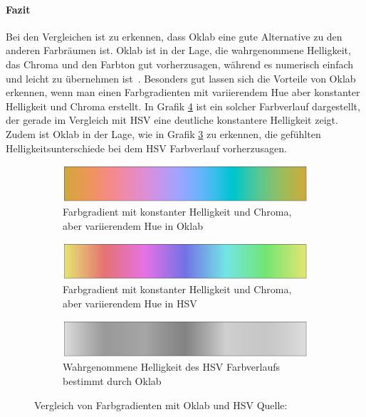 \documentclass[12pt, a4paper, ngerman]{article}
\begin{document}
\paragraph{Fazit}
Bei den Vergleichen ist zu erkennen, dass Oklab eine gute Alternative zu den anderen Farbräumen ist.
Oklab ist in der Lage, die wahrgenommene Helligkeit, das Chroma und den Farbton gut vorherzusagen, 
während es numerisch einfach und leicht zu übernehmen ist~\cite{Oklab_2020}.
Besonders gut lassen sich die Vorteile von Oklab erkennen, 
wenn man einen Farbgradienten mit variierendem Hue aber konstanter Helligkeit und Chroma erstellt. 
In Grafik \ref{fig:oklab_hsv} ist ein solcher Farbverlauf dargestellt, der gerade im Vergleich mit HSV eine deutliche konstantere Helligkeit zeigt. 
Zudem ist Oklab in der Lage, wie in Grafik \ref{fig:hsv_lightness} zu erkennen, die gefühlten Helligkeitsunterschiede bei dem HSV Farbverlauf vorherzusagen.

\begin{figure}
  \centering
  \begin{subfigure}[b]{\linewidth}
  \centering
  \includegraphics[width=0.9\linewidth]{Grafiken/Oklab_HSV/hue_oklab.png}
  \caption{Farbgradient mit konstanter Helligkeit und Chroma, aber variierendem Hue in Oklab}
  \label{fig:hue_oklab}
  \end{subfigure}
  
  \begin{subfigure}[b]{\linewidth}
  \centering
  \includegraphics[width=0.9\linewidth]{Grafiken/Oklab_HSV/hue_hsv.png}
  \caption{Farbgradient mit konstanter Helligkeit und Chroma, aber variierendem Hue in HSV}
  \label{fig:hue_hsv}
  \end{subfigure}
  
  \begin{subfigure}[b]{\linewidth}
  \centering
  \includegraphics[width=0.9\linewidth]{Grafiken/Oklab_HSV/hue_hsv_lightness.png}
  \caption{Wahrgenommene Helligkeit des HSV Farbverlaufs bestimmt durch Oklab}
  \label{fig:hsv_lightness}
  \end{subfigure}
  
  \caption{Vergleich von Farbgradienten mit Oklab und HSV Quelle:~\cite{Oklab_2020}}
  \label{fig:oklab_hsv}
\end{figure}
\end{document}

